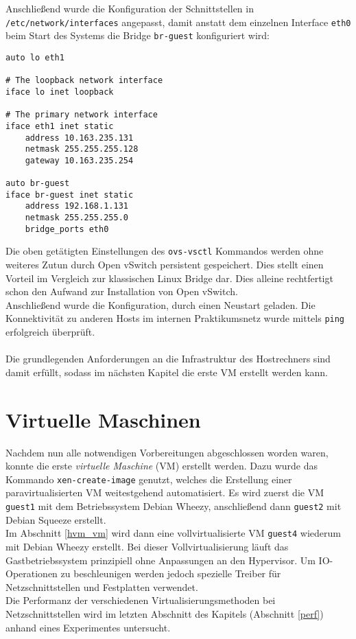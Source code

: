 Anschließend wurde die Konfiguration der Schnittstellen in \verb#/etc/network/interfaces# angepasst, damit anstatt dem einzelnen Interface \verb#eth0# beim Start des Systems die Bridge \verb#br-guest# konfiguriert wird:
\setupVerbatimOut
\begin{verbatim}
auto lo eth1

# The loopback network interface
iface lo inet loopback

# The primary network interface
iface eth1 inet static
    address 10.163.235.131
    netmask 255.255.255.128
    gateway 10.163.235.254

auto br-guest
iface br-guest inet static
    address 192.168.1.131
    netmask 255.255.255.0
    bridge_ports eth0
\end{verbatim}

Die oben getätigten Einstellungen des \verb#ovs-vsctl# Kommandos werden ohne weiteres Zutun durch Open vSwitch persistent gespeichert. Dies stellt einen Vorteil im Vergleich zur klassischen Linux Bridge dar. Dies alleine rechtfertigt schon den Aufwand zur Installation von Open vSwitch. 
\\
Anschließend wurde die Konfiguration, durch einen Neustart geladen. Die Konnektivität zu anderen Hosts im internen Praktikumsnetz wurde mittels \verb#ping# erfolgreich überprüft.
\\
\\
Die grundlegenden Anforderungen an die Infrastruktur des Hostrechners sind damit erfüllt, sodass im nächsten Kapitel die erste VM erstellt werden kann.

\chapter{Virtuelle Maschinen}\label{vms}
Nachdem nun alle notwendigen Vorbereitungen abgeschlossen worden waren, konnte die erste \emph{virtuelle Maschine} (VM) erstellt werden. Dazu wurde das Kommando \verb#xen-create-image# genutzt, welches die Erstellung einer paravirtualisierten VM weitestgehend automatisiert. Es wird zuerst die VM \verb#guest1# mit dem Betriebssystem Debian Wheezy, anschließend dann \verb#guest2# mit Debian Squeeze erstellt.
\\
Im Abschnitt \ref{hvm_vm} wird dann eine vollvirtualisierte VM \verb#guest4# wiederum mit Debian Wheezy erstellt. Bei dieser Vollvirtualisierung läuft das Gastbetriebssystem prinzipiell ohne Anpassungen an den Hypervisor. Um IO-Operationen zu beschleunigen werden jedoch spezielle Treiber für Netzschnittstellen und Festplatten verwendet. 
\\
Die Performanz der verschiedenen Virtualisierungsmethoden bei Netzschnittstellen wird im letzten Abschnitt des Kapitels (Abschnitt \ref{perf}) anhand eines Experimentes untersucht.

